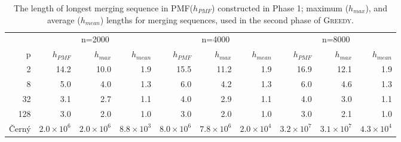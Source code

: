 \documentclass[12pt]{article}
\newcommand{\kkcomm}[1]{{\color{red}{\bf kk: #1}}}
\newcommand{\comment}[2]{{\color{red}{\bf (#1: #2)}}}
\newcommand{\greedyAlgo}{\textsc{Greedy}}
\begin{document}
\begin{table}[ht]
	\center
	\begin{tabular}{r|rrr|rrr|rrr}
 		& \multicolumn{3}{c|}{n=2000} & \multicolumn{3}{c|}{n=4000} & \multicolumn{3}{c}{n=8000} \\
		p &  $h_{PMF}$ &  $h_{max}$ &  $h_{mean}$ &  $h_{PMF}$ &  $h_{max}$ &  $h_{mean}$ &  $h_{PMF}$ &  $h_{max}$ &  $h_{mean}$ \\ \hline
 		2 &  14.2 &  10.0 &  1.9 &  15.5 &  11.2 &  1.9 &  16.9 &  12.1 &  1.9 \\
 		8 &  5.0 &  4.0 &  1.3 &  6.0 &  4.2 &  1.3 &  6.0 &  4.6 &  1.3 \\
		32 &  3.1 &  2.7 &  1.1 &  4.0 &  2.9 &  1.1 &  4.0 &  3.0 &  1.1 \\
		128 &  3.0 &  2.0 &  1.0 &  3.0 &  2.0 &  1.0 &  3.0 &  2.1 &  1.0 \\
		\v{C}ern\'y & $2.0\times10^6$ & $2.0\times10^6$ & $8.8\times10^3$ & $8.0\times10^6$ & $7.8\times10^6$ & $2.0\times10^4$ & $3.2\times10^7$ & $3.1\times10^7$ & $4.3\times10^4$
	\end{tabular}
	\caption{The length of longest merging sequence in PMF($h_{PMF}$) constructed in Phase 1; maximum ($h_{max}$), and average ($h_{mean}$) lengths for merging sequences, used in the second phase of \greedyAlgo. \comment{sertac}{cerny deney sonuclari cok uzun oldu. yeni tabloya mi koysam? yoksa kuculteyim mi?} \kkcomm{yeni tablo olur bence}}
	\label{table:levels}
\end{table}
\end{document}
